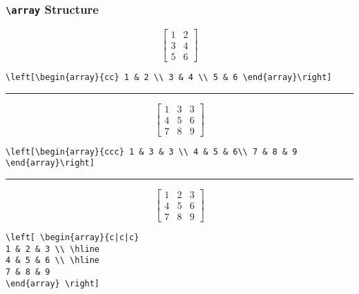 \subsubsection{\texttt{\large \textbackslash array} Structure}
$$\left[\begin{array}{cc} 1 & 2 \\ 3 & 4 \\ 5 & 6 \end{array}\right]$$
%
\begin{center}
\verb!\left[\begin{array}{cc} 1 & 2 \\ 3 & 4 \\ 5 & 6 \end{array}\right]!
\end{center}
%
\begin{center}{\rule{10cm}{0.5pt}}\end{center}
%
$$\left[\begin{array}{ccc} 1 & 3 & 3 \\ 4 & 5 & 6\\ 7 & 8 & 9 \end{array}\right]$$
%
\begin{center}
\verb!\left[\begin{array}{ccc} 1 & 3 & 3 \\ 4 & 5 & 6\\ 7 & 8 & 9 \end{array}\right]!
\end{center}
%
\begin{center}{\rule{10cm}{0.5pt}}\end{center}
%
$$ \left[ \begin{array}{c|c|c}
1 & 2 & 3 \\ \hline
4 & 5 & 6 \\ \hline
7 & 8 & 9
\end{array} \right] $$
%
\begin{center}
\begin{verbatim}
\left[ \begin{array}{c|c|c}
1 & 2 & 3 \\ \hline
4 & 5 & 6 \\ \hline
7 & 8 & 9
\end{array} \right] 
\end{verbatim}
\end{center}
